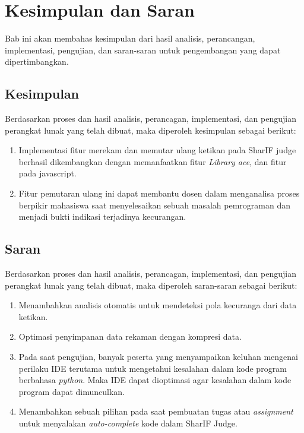 \chapter{Kesimpulan dan Saran}
\label{chap:kesimpulandansaran}

Bab ini akan membahas kesimpulan dari hasil analisis, perancangan, implementasi, pengujian, dan saran-saran untuk pengembangan yang dapat dipertimbangkan.

\section{Kesimpulan}
Berdasarkan proses dan hasil analisis, perancagan, implementasi, dan pengujian perangkat lunak yang telah dibuat, maka diperoleh kesimpulan sebagai berikut:

\begin{enumerate}
	\item Implementasi fitur merekam dan memutar ulang ketikan pada SharIF judge berhasil dikembangkan dengan memanfaatkan fitur \textit{Library ace}, dan fitur pada javascript.
	
	\item Fitur pemutaran ulang ini dapat membantu dosen dalam menganalisa proses berpikir mahasiswa saat menyelesaikan sebuah masalah pemrograman dan menjadi bukti indikasi terjadinya kecurangan.
\end{enumerate}

\section{Saran}
Berdasarkan proses dan hasil analisis, perancagan, implementasi, dan pengujian perangkat lunak yang telah dibuat, maka diperoleh saran-saran sebagai berikut:

\begin{enumerate}
	\item Menambahkan analisis otomatis untuk mendeteksi pola kecuranga dari data ketikan.
	\item Optimasi penyimpanan data rekaman dengan kompresi data.
	\item Pada saat pengujian, banyak peserta yang menyampaikan keluhan mengenai perilaku IDE terutama untuk mengetahui kesalahan dalam kode program berbahasa \textit{python}. Maka IDE dapat dioptimasi agar kesalahan dalam kode program dapat dimunculkan.
	\item Menambahkan sebuah pilihan pada saat pembuatan tugas atau \textit{assignment} untuk menyalakan \textit{auto-complete} kode dalam SharIF Judge.
\end{enumerate}
